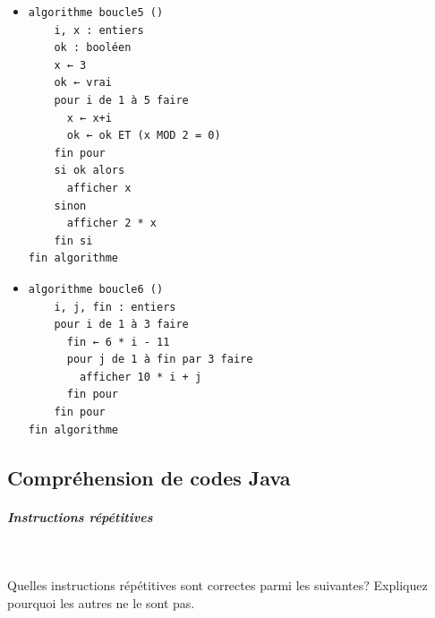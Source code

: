 \documentclass[11pt,a4paper]{article}
\begin{document}
\begin{itemize}
			\item \begin{verbatim}
algorithme boucle5 ()
    i, x : entiers
    ok : booléen
    x ← 3
    ok ← vrai
    pour i de 1 à 5 faire
      x ← x+i
      ok ← ok ET (x MOD 2 = 0)
    fin pour
    si ok alors
      afficher x
    sinon
      afficher 2 * x
    fin si
fin algorithme
				\end{verbatim} \textcolor{gray}{\underline{\hspace*{2em}}} 
			\item \begin{verbatim}
algorithme boucle6 ()
    i, j, fin : entiers
    pour i de 1 à 3 faire
      fin ← 6 * i - 11
      pour j de 1 à fin par 3 faire
        afficher 10 * i + j
      fin pour
    fin pour
fin algorithme
				\end{verbatim} \textcolor{gray}{\underline{\hspace*{10em}}} 
					\end{itemize}
				
            \par
        \subsection{Compr\'ehension de codes Java}
			
		\subparagraph{Instructions r\'ep\'etitives} 
		
                \textcolor{white}{.} \par
            
							Quelles instructions r\'ep\'etitives sont correctes parmi les suivantes? 
							Expliquez pourquoi les autres ne le sont pas.
						
\end{document}
